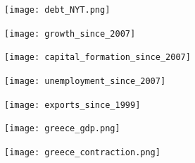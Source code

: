 \documentclass{beamer}
\begin{document}
\begin{frame}
  \begin{figure}
    \texttt{[image: debt\_NYT.png]}
  \end{figure}
\end{frame}

\begin{frame}
  \begin{figure}
    \texttt{[image: growth\_since\_2007]}
  \end{figure}
\end{frame}

\begin{frame}
  \begin{figure}
    \texttt{[image: capital\_formation\_since\_2007]}
  \end{figure}
\end{frame}

\begin{frame}
  \begin{figure}
    \texttt{[image: unemployment\_since\_2007]}
  \end{figure}
\end{frame}

\begin{frame}
  \begin{figure}
    \texttt{[image: exports\_since\_1999]}
  \end{figure}
\end{frame}

\begin{frame}
  \begin{figure}
    \texttt{[image: greece\_gdp.png]}
  \end{figure}
\end{frame}

\begin{frame}
  \begin{figure}
    \texttt{[image: greece\_contraction.png]}
  \end{figure}
\end{frame}
\end{document}
